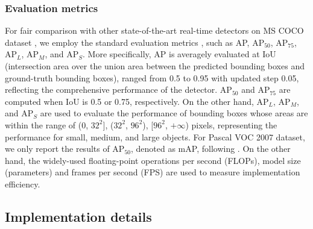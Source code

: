 \documentclass[lettersize,journal]{IEEEtran}
\begin{document}
\subsubsection{Evaluation metrics}

For fair comparison with other state-of-the-art real-time detectors on MS COCO dataset \cite{lin2014microsoft}, we employ the standard evaluation metrics \cite{lin2017focal,redmon2018yolov3,wang2021scaled}, such as AP, AP$_{50}$, AP$_{75}$, AP$_{L}$, AP$_{M}$, and AP$_{S}$. More specifically, AP is averagely evaluated at IoU (intersection area over the union area between the predicted bounding boxes and ground-truth bounding boxes), ranged from 0.5 to 0.95 with updated step 0.05, reflecting the comprehensive performance of the detector. AP$_{50}$ and AP$_{75}$ are computed when IoU is 0.5 or 0.75, respectively. On the other hand, AP$_{L}$, AP$_{M}$, and AP$_{S}$ are used to evaluate the performance of bounding boxes whose areas are within the range of (0, $32^{2}]$, ($32^{2}$, $96^{2}$), [$96^{2}$, $+\infty$) pixels, representing the performance for small, medium, and large objects. For Pascal VOC 2007 \cite{everingham2010pascal} dataset, we only report the results of AP$_{50}$, denoted as mAP, following \cite{qin2019thundernet,shen2019object}. On the other hand, the widely-used floating-point operations per second (FLOPs), model size (parameters) and frames per second (FPS) are used to measure implementation efficiency.

\subsection{Implementation details}\label{sec:settings}
\end{document}
